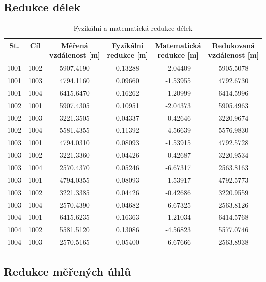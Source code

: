 \subsection{Redukce délek}
\begin{table}[H]
\centering
\begin{tabular}{|c|c||c||c|c||c|}
\hline
St. & Cíl & \makecell{Měřená\\vzdálenost [m]} & \makecell{Fyzikální\\redukce [m]} & \makecell{Matematická\\redukce [m]} & \makecell{Redukovaná\\vzdálenost [m]}\\ \hline
1001 & 1002 & 5907.4190 & 0.13288 & -2.04409 & 5905.5078 \\ \hline
1001 & 1003 & 4794.1160 & 0.09660 & -1.53955 & 4792.6730 \\ \hline
1001 & 1004 & 6415.6470 & 0.16262 & -1.20999 & 6414.5996 \\ \hline
1002 & 1001 & 5907.4305 & 0.10951 & -2.04373 & 5905.4963 \\ \hline
1002 & 1003 & 3221.3505 & 0.04337 & -0.42646 & 3220.9674 \\ \hline
1002 & 1004 & 5581.4355 & 0.11392 & -4.56639 & 5576.9830 \\ \hline
1003 & 1001 & 4794.0310 & 0.08093 & -1.53915 & 4792.5728 \\ \hline
1003 & 1002 & 3221.3360 & 0.04426 & -0.42687 & 3220.9534 \\ \hline
1003 & 1004 & 2570.4370 & 0.05246 & -6.67317 & 2563.8163 \\ \hline
1003 & 1001 & 4794.0355 & 0.08093 & -1.53917 & 4792.5773 \\ \hline
1003 & 1002 & 3221.3385 & 0.04426 & -0.42686 & 3220.9559 \\ \hline
1003 & 1004 & 2570.4390 & 0.04682 & -6.67325 & 2563.8126 \\ \hline
1004 & 1001 & 6415.6235 & 0.16363 & -1.21034 & 6414.5768 \\ \hline
1004 & 1002 & 5581.5120 & 0.13086 & -4.56823 & 5577.0746 \\ \hline
1004 & 1003 & 2570.5165 & 0.05400 & -6.67666 & 2563.8938 \\ 
\hline
\end{tabular}
\caption{Fyzikální a matematická redukce délek}
\end{table}



\subsection{Redukce měřených úhlů}
